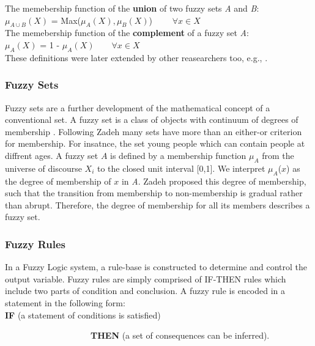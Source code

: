 \documentclass[11pt]{article}
\begin{document}
\noindent The memebership function of the \textbf{union} of two fuzzy sets
\textit{A} and \textit{B}:\\

$\mu_{A \cup B}(X)$ = Max($\mu_{A}(X), \mu_{B}(X)$) $\qquad \forall x \in X$\\

\noindent The memebership function of the \textbf{complement} of a fuzzy set
\textit{A}:\\

$\mu_{A}(X)$ = 1 - $\mu_{A}(X) \qquad \forall x \in X$\\

\noindent These definitions were later extended by other reasearchers too, e.g.,
\cite{yager:generalizing-leximin}.

\subsubsection{Fuzzy Sets}

Fuzzy sets are a further development of the mathematical concept of a
conventional set. A fuzzy set is a class of objects with continuum of
degrees of membership \cite{zadeh:fuzzy}. Following Zadeh \cite{zadeh:fuzzy}
many sets have more than an either-or criterion for membership. For insatnce,
the set young people which can contain people at diffrent ages. A fuzzy set
$\textit{A}$ is defined by a membership function $\mu_A$ from the universe of
discourse $X_i$ to the closed unit interval [0,1]. We interpret
$\mu_A$($\textit{x}$) as the degree of membership of $\textit{x}$ in \textit{A}.
Zadeh proposed this degree of membership, such that the transition from
membership to non-membership is gradual rather than abrupt. Therefore, the
degree of membership for all its members describes a fuzzy set.

\subsubsection{Fuzzy Rules}
\label{sec:fuzzy-rules}

In a Fuzzy Logic system, a rule-base is constructed to determine and control the
output variable. Fuzzy rules are simply comprised of IF-THEN rules which include
two parts of condition and conclusion. A fuzzy rule is encoded in a statement in
the following form:\\

\noindent \textbf{IF} (a statement of conditions is satisfied)

$\qquad\qquad\qquad\qquad\qquad$\textbf{THEN} (a set of consequences can
be inferred).\\
\end{document}
